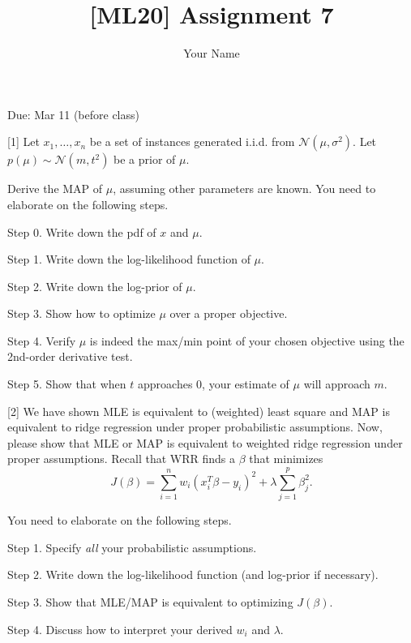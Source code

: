 \documentclass{llncs}
\title{[ML20] Assignment 7}
\author{Your Name}
\institute{}
\begin{document}
\maketitle 

\setlength\parindent{0pt} 
\setlength{\parskip}{10pt}

Due: Mar 11 (before class)

[1] Let $x_{1}, \ldots, x_{n}$ be a set of 
instances generated i.i.d. from  
$\mathcal{N}(\mu, \sigma^{2})$. 
Let $p(\mu) \sim \mathcal{N}(m, t^{2})$ 
be a prior of $\mu$. 

Derive the MAP of $\mu$, assuming other 
parameters are known. 
You need to elaborate on the following steps. 

Step 0. Write down the pdf of $x$ and $\mu$. 

Step 1. Write down the log-likelihood function 
of $\mu$. 

Step 2. Write down the log-prior of $\mu$. 

Step 3. Show how to optimize $\mu$ over a proper objective. 

Step 4. Verify $\mu$ is indeed the max/min
point of your chosen objective using the 2nd-order 
derivative test. 

Step 5. Show that when $t$ approaches 0, your 
estimate of $\mu$ will approach $m$. 

\vspace{50pt}

[2] We have shown MLE is equivalent to 
(weighted) least square and MAP is equivalent 
to ridge regression under proper probabilistic 
assumptions. Now, please show that MLE or MAP 
is equivalent to weighted ridge regression under 
proper assumptions. Recall that WRR finds a $\beta$ 
that minimizes 
\begin{equation}
J(\beta) = \sum_{i=1}^{n} w_{i} (x_{i}^{T} \beta 
- y_{i})^{2} + \lambda \sum_{j=1}^{p} \beta_{j}^{2}. 
\end{equation}

You need to elaborate on the following steps. 

Step 1. Specify \textit{all} your probabilistic assumptions. 

Step 2. Write down the log-likelihood function (and log-prior 
if necessary). 

Step 3. Show that MLE/MAP is equivalent 
to optimizing $J(\beta)$. 

Step 4. Discuss how to interpret your 
derived $w_{i}$ and $\lambda$. 
\end{document}
